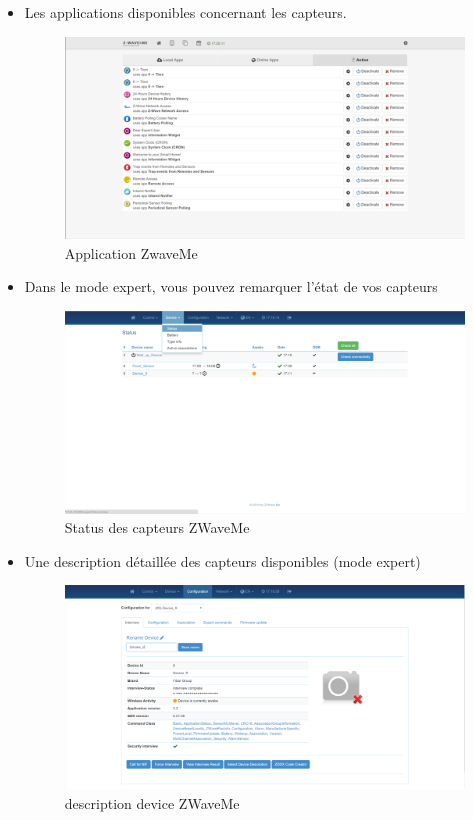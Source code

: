 \begin{itemize}
\item Les applications disponibles concernant les capteurs.

\begin{figure}[h]
	\center
\includegraphics[scale=0.5]{./Images/png/app_zwaveme.png} 
	\caption{Application ZwaveMe}
\end{figure}

\item Dans le mode expert, vous pouvez remarquer l'état de vos capteurs

\begin{figure}[h]
	\center
\includegraphics[scale=0.5]{./Images/png/device_Status.png}
	\caption{Status des capteurs ZWaveMe}
\end{figure}


\item Une description détaillée des capteurs disponibles (mode expert)

\begin{figure}[h]
	\center
\includegraphics[scale=0.5]{./Images/png/description_zwaveme.png}
	\caption{description device ZWaveMe}
\end{figure}


\end{itemize}
